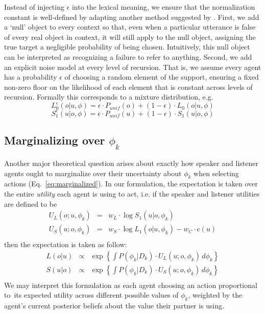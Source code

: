 \documentclass[11pt, floatsintext]{apa6}
\begin{document}
Instead of injecting $\epsilon$ into the lexical meaning, we ensure that the normalization constant is well-defined by adapting another method suggested by .
First, we add a `null' object to every context so that, even when a particular utterance is false of every real object in context, it will still apply to the null object, assigning the true target a negligible probability of being chosen.
Intuitively, this null object can be interpreted as recognizing a failure to refer to anything.
Second, we add an explicit noise model at every level of recursion.
That is, we assume every agent has a probability $\epsilon$ of choosing a random element of the support, ensuring a fixed non-zero floor on the likelihood of each element that is constant across levels of recursion.
Formally this corresponds to a mixture distribution, e.g. 
$$L_0^{\epsilon}(o|u,\phi) = \epsilon \cdot P_{unif}(o) + (1-\epsilon) \cdot L_0(o|u,\phi)$$
$$S_1^{\epsilon}(u|o,\phi) = \epsilon \cdot P_{unif}(u) + (1-\epsilon) \cdot S_1(u|o,\phi)$$

\subsection{Marginalizing over $\phi_k$}
Another major theoretical question arises about exactly how speaker and listener agents ought to marginalize over their uncertainty about $\phi_k$ when selecting actions (Eq.~\ref{eq:marginalized}). 
In our formulation, the expectation is taken over the entire \emph{utility} each agent is using to act, i.e. if the speaker and listener utilities are defined to be 
$$
\begin{array}{rcl}
U_L(o;u, \phi_k) & = & w_L \cdot \log S_1(u|o, \phi_k)\\
U_S(u;o, \phi_k) & = & w_S \cdot \log L_1(o|u, \phi_k) - w_C \cdot c(u) \\
\end{array}
$$
then the expectation is taken as follow:
$$
\begin{array}{rcl}
L(o|u) & \propto & \exp\left\{\int P(\phi_k |D_k)\cdot U_L(u; o, \phi_k) \, d \phi_k\right\}\\
S(u|o) & \propto & \exp\left\{\int P(\phi_k | D_k) \cdot U_S(u; o, \phi_k) \, d \phi_k\right\} \\
\end{array}
$$
We may interpret this formulation as each agent choosing an action proportional to its expected utility across different possible values of $\phi_k$, weighted by the agent's current posterior beliefs about the value their partner is using.
\end{document}
